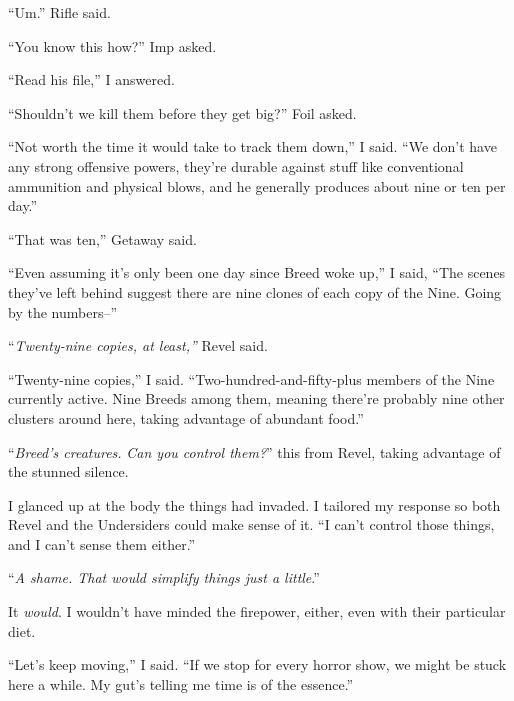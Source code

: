 ``Um.''  Rifle said.



``You know this how?'' Imp asked.



``Read his file,'' I answered.



``Shouldn't we kill them before they get big?''  Foil asked.



``Not worth the time it would take to track them down,'' I said.  ``We don't have any strong offensive powers, they're durable against stuff like conventional ammunition and physical blows, and he generally produces about nine or ten per day.''



``That was ten,'' Getaway said.



``Even assuming it's only been one day since Breed woke up,'' I said, ``The scenes they've left behind suggest there are nine clones of each copy of the Nine.  Going by the numbers--''



``\emph{Twenty-nine copies, at least,'' }Revel said.



``Twenty-nine copies,'' I said.  ``Two-hundred-and-fifty-plus members of the Nine currently active.  Nine Breeds among them, meaning there're probably nine other clusters around here, taking advantage of abundant food.''



``\emph{Breed's creatures.  }\emph{Can you control them?}'' this from Revel, taking advantage of the stunned silence.



I glanced up at the body the things had invaded.  I tailored my response so both Revel and the Undersiders could make sense of it.  ``I can't control those things, and I can't sense them either.''



``\emph{A shame.  That would simplify things just a little}.''



It \emph{would}.  I wouldn't have minded the firepower, either, even with their particular diet.



``Let's keep moving,'' I said.  ``If we stop for every horror show, we might be stuck here a while.  My gut's telling me time is of the essence.''



